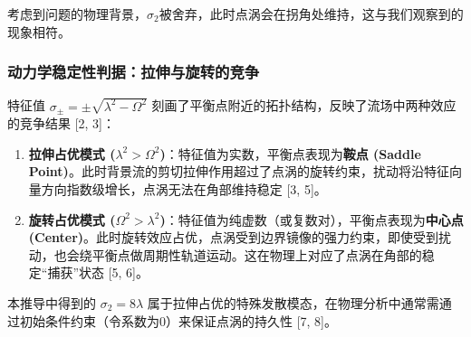 考虑到问题的物理背景，$\sigma_{2}$被舍弃，此时点涡会在拐角处维持，这与我们观察到的现象相符。

\subsubsection*{动力学稳定性判据：拉伸与旋转的竞争}
特征值 $\sigma_{\pm} = \pm \sqrt{\lambda^2 - \Omega^2}$ 刻画了平衡点附近的拓扑结构，反映了流场中两种效应的竞争结果 [2, 3]：
\begin{enumerate}
    \item \textbf{拉伸占优模式 ($\lambda^2 > \Omega^2$)}：特征值为实数，平衡点表现为\textbf{鞍点 (Saddle Point)}。此时背景流的剪切拉伸作用超过了点涡的旋转约束，扰动将沿特征向量方向指数级增长，点涡无法在角部维持稳定 [3, 5]。
    \item \textbf{旋转占优模式 ($\Omega^2 > \lambda^2$)}：特征值为纯虚数（或复数对），平衡点表现为\textbf{中心点 (Center)}。此时旋转效应占优，点涡受到边界镜像的强力约束，即使受到扰动，也会绕平衡点做周期性轨道运动。这在物理上对应了点涡在角部的稳定“捕获”状态 [5, 6]。
\end{enumerate}
本推导中得到的 $\sigma_2 = 8\lambda$ 属于拉伸占优的特殊发散模态，在物理分析中通常需通过初始条件约束（令系数为0）来保证点涡的持久性 [7, 8]。